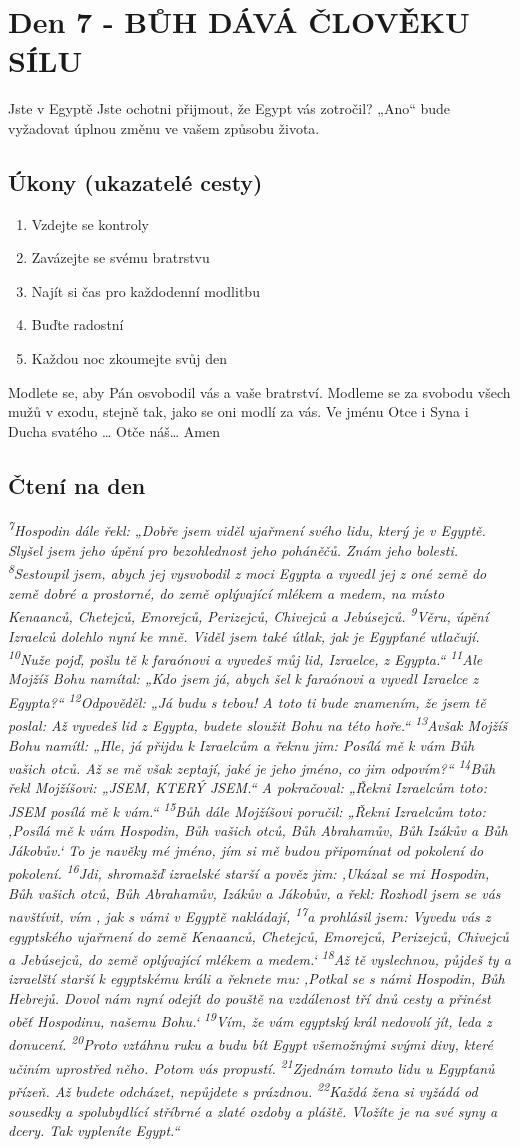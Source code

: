 \documentclass[11pt]{article}
\newcommand{\zacatekPrvniTyden}{
  Jste v Egyptě \newline
  Jste ochotni přijmout, že Egypt vás zotročil? „Ano“ bude vyžadovat úplnou změnu ve vašem způsobu života.

\subsection*{Úkony (ukazatelé cesty)}
\begin{enumerate}
  \item Vzdejte se kontroly
  \item Zavázejte se svému bratrstvu
  \item Najít si čas pro každodenní modlitbu
  \item Buďte radostní
  \item Každou noc zkoumejte svůj den
\end{enumerate}
Modlete se, aby Pán osvobodil vás a vaše bratrství. \newline
Modleme se za svobodu všech mužů v exodu, stejně tak, jako se oni modlí za vás.\newline
Ve jménu Otce i Syna i Ducha svatého …  Otče náš… Amen
}
\begin{document}
\newpage
\section{Den 7 - BŮH DÁVÁ ČLOVĚKU SÍLU}
\zacatekPrvniTyden
\subsection*{Čtení na den}
\textbf{}
\newline
\textit{
\textsuperscript{7}Hospodin dále řekl: „Dobře jsem viděl ujařmení svého lidu, který je v Egyptě. Slyšel jsem jeho úpění pro bezohlednost jeho poháněčů. Znám jeho bolesti.
\textsuperscript{8}Sestoupil jsem, abych jej vysvobodil z moci Egypta a vyvedl jej z oné země do země dobré a prostorné, do země oplývající mlékem a medem, na místo Kenaanců, Chetejců, Emorejců, Perizejců, Chivejců a Jebúsejců.
\textsuperscript{9}Věru, úpění Izraelců dolehlo nyní ke mně. Viděl jsem také útlak, jak je Egypťané utlačují.
\textsuperscript{10}Nuže pojď, pošlu tě k faraónovi a vyvedeš můj lid, Izraelce, z Egypta.“
\textsuperscript{11}Ale Mojžíš Bohu namítal: „Kdo jsem já, abych šel k faraónovi a vyvedl Izraelce z Egypta?“
\textsuperscript{12}Odpověděl: „Já budu s tebou! A toto ti bude znamením, že jsem tě poslal: Až vyvedeš lid z Egypta, budete sloužit Bohu na této hoře.“
\textsuperscript{13}Avšak Mojžíš Bohu namítl: „Hle, já přijdu k Izraelcům a řeknu jim: Posílá mě k vám Bůh vašich otců. Až se mě však zeptají, jaké je jeho jméno, co jim odpovím?“
\textsuperscript{14}Bůh řekl Mojžíšovi: „JSEM, KTERÝ JSEM.“ A pokračoval: „Řekni Izraelcům toto: JSEM posílá mě k vám.“
\textsuperscript{15}Bůh dále Mojžíšovi poručil: „Řekni Izraelcům toto: ‚Posílá mě k vám Hospodin, Bůh vašich otců, Bůh Abrahamův, Bůh Izákův a Bůh Jákobův.‘ To je navěky mé jméno, jím si mě budou připomínat od pokolení do pokolení.
\textsuperscript{16}Jdi, shromažď izraelské starší a pověz jim: ,Ukázal se mi Hospodin, Bůh vašich otců, Bůh Abrahamův, Izákův a Jákobův, a řekl: Rozhodl jsem se vás navštívit, vím , jak s vámi v Egyptě nakládají,
\textsuperscript{17}a prohlásil jsem: Vyvedu vás z egyptského ujařmení do země Kenaanců, Chetejců, Emorejců, Perizejců, Chivejců a Jebúsejců, do země oplývající mlékem a medem.‘
\textsuperscript{18}Až tě vyslechnou, půjdeš ty a izraelští starší k egyptskému králi a řeknete mu: ‚Potkal se s námi Hospodin, Bůh Hebrejů. Dovol nám nyní odejít do pouště na vzdálenost tří dnů cesty a přinést oběť Hospodinu, našemu Bohu.‘
\textsuperscript{19}Vím, že vám egyptský král nedovolí jít, leda z donucení.
\textsuperscript{20}Proto vztáhnu ruku a budu bít Egypt všemožnými svými divy, které učiním uprostřed něho. Potom vás propustí.
\textsuperscript{21}Zjednám tomuto lidu u Egypťanů přízeň. Až budete odcházet, nepůjdete s prázdnou.
\textsuperscript{22}Každá žena si vyžádá od sousedky a spolubydlící stříbrné a zlaté ozdoby a pláště. Vložíte je na své syny a dcery. Tak vypleníte Egypt.“
}
\end{document}
